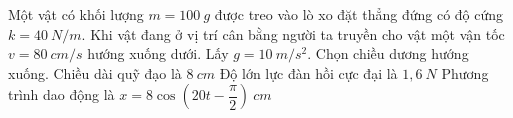 \begin{ex}
	Một vật có khối lượng $m=100 \ g$ được treo vào lò xo đặt thẳng đứng có độ cứng $k=40 \ N/m$. Khi vật đang ở vị trí cân bằng người ta truyền cho vật một vận tốc $v=80 \ cm/s$ hướng xuống dưới. Lấy $g=10 \ m/s^2$. Chọn chiều dương hướng xuống.
	{\True Chiều dài quỹ đạo là $8 \ cm$}
	{Độ lớn lực đàn hồi cực đại là $1,6 \ N$}
	{Phương trình dao động là $x=8 \cos \left(20 t-\dfrac{\pi}{2}\right)\ cm$}
\end{ex}
